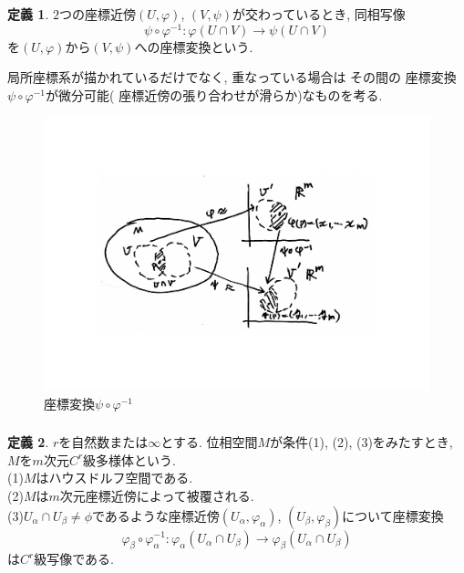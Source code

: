 \documentclass[dvipdfmx,cjk]{beamer}
\theoremstyle{definition}
\newtheorem{dfn}{\textbf{ 定義 }}
\begin{document}
\begin{frame}
  \frametitle{}
  \begin{dfn}
    $2$つの座標近傍$(U, \varphi)$, 
    $(V, \psi)$が交わっているとき, 同相写像
    $$\psi \circ \varphi^{-1}:\varphi(U\cap V)\rightarrow \psi(U\cap V)$$
    を$(U, \varphi)$から$(V, \psi)$への座標変換という. 
\end{dfn}
局所座標系が描かれているだけでなく, 重なっている場合は
その間の
座標変換$\psi \circ \varphi^{-1}$が微分可能(
座標近傍の張り合わせが滑らか)なものを考る. 
\begin{figure}[H]
    \centering
    \includegraphics[keepaspectratio, scale=0.3]{coordinateConversionBig.pdf}
    \caption{座標変換$\psi \circ \varphi^{-1}$}
    \label{coordinateConversion}
   \end{figure}
\end{frame}

\begin{frame}
  \frametitle{} 
  \begin{dfn}
  $r$を自然数または$\infty$とする. 位相空間$M$が条件(1), (2), (3)をみたすとき, 
  $M$を$m$次元$\mathit{C}^r$級多様体という. \\
  (1)$M$はハウスドルフ空間である. \\
  (2)$M$は$m$次元座標近傍によって被覆される. \\
  (3)$U_\alpha \cap U_\beta \neq \phi$であるような座標近傍$(U_\alpha, \varphi_\alpha)$, 
  $(U_\beta, \varphi_\beta)$について座標変換
  $$\varphi_\beta \circ \varphi_\alpha^{-1}: \varphi_\alpha(U_\alpha \cap U_\beta)
  \rightarrow \varphi_\beta(U_\alpha \cap U_\beta)$$
  は$\mathit{C}^r$級写像である. 
  \end{dfn}
  \end{frame}
  
\end{document}
